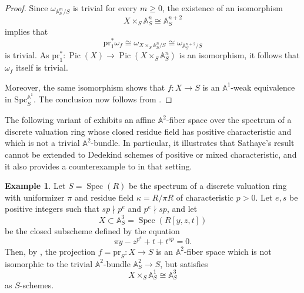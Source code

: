 \documentclass[10pt]{amsart}
\renewcommand{\AA}{\mathbb{A}}
\newcommand{\Spec}{\operatorname{Spec}}
\numberwithin{equation}{section} %
\theoremstyle{plain}
\theoremstyle{definition}
\newtheorem{example}[example]{Example}
\theoremstyle{remark}
\newcommand{\Pic}{\operatorname{Pic}}
\begin{document}
\begin{proof}
Since $\omega_{\AA^m_S/S}$ is trivial for every $m\geq 0$, the existence of an isomorphism
\[
X\times_S \AA^n_S \cong \AA^{n+2}_S
\]
implies that
\[
\mathrm{pr}_1^*\omega_f \cong \omega_{X\times_S \AA^n_S/S} \cong \omega_{\AA^{n+2}_S/S}
\]
is trivial. As $\mathrm{pr}_1^*:\Pic(X)\to \Pic(X\times_S \AA^n_S)$ is an isomorphism, it follows that $\omega_f$ itself is trivial.

Moreover, the same isomorphism shows that $f:X\to S$ is an $\AA^1$-weak equivalence in $\mathrm{Spc}_S^{\AA^1}$. The conclusion now follows from .
\end{proof}

The following variant of  exhibits an affine $\AA^2$-fiber space over the spectrum of a discrete valuation ring whose closed residue field has positive characteristic and which is not a trivial $\AA^2$-bundle. In particular, it illustrates that Sathaye’s result \cite{sathaye1983polynomial} cannot be extended to Dedekind schemes of positive or mixed characteristic, and it also provides a counterexample to  in that setting.

\begin{example}
Let $S=\Spec(R)$ be the spectrum of a discrete valuation ring with uniformizer $\pi$ and residue field $\kappa=R/\pi R$ of characteristic $p>0$. Let $e,s$ be positive integers such that $sp\nmid p^e$ and $p^e\nmid sp$, and let
\[
X\subset \AA^3_S=\Spec(R[y,z,t])
\]
be the closed subscheme defined by the equation
\[
\pi y - z^{p^e} + t + t^{sp} = 0.
\]
Then, by \cite[Corollary~5.3]{asanuma1987polynomial}, the projection $f=\mathrm{pr}_S:X\to S$ is an $\AA^2$-fiber space which is not isomorphic to the trivial $\AA^2$-bundle $\AA^2_S\to S$, but satisfies
\[
X\times_S \AA^1_S \cong \AA^3_S
\]
as $S$-schemes.
\end{example}




\end{document}
